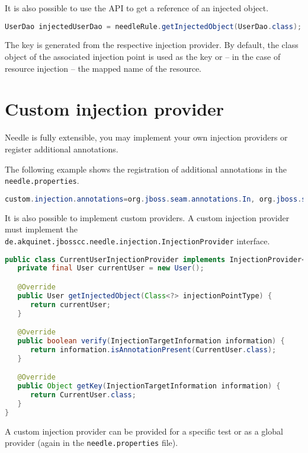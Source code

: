 It is also possible to use the API to get a reference of an injected object.

\begin{lstlisting}[language={JAVA},caption=Injected Components]
UserDao injectedUserDao = needleRule.getInjectedObject(UserDao.class);
\end{lstlisting}

The key is generated from the respective injection provider. By default, the class object of the associated injection point is used as the key or
-- in the case of resource injection -- the mapped name of the resource.

\section{Custom injection provider}
\label{sec:Custom injection provider}

Needle is fully extensible, you may implement your own injection providers or register additional annotations.

The following example shows the registration of additional annotations in the \verb|needle.properties|.

\begin{lstlisting}[language={JAVA},caption=Additional Annotation]
custom.injection.annotations=org.jboss.seam.annotations.In, org.jboss.seam.annotations.Logger
\end{lstlisting}

It is also possible to implement custom providers.
A custom injection provider must implement the \verb|de.akquinet.jbosscc.needle.injection.InjectionProvider| interface.

\begin{lstlisting}[language={JAVA},caption=javax.inject.Qualifier Injection Provider]
public class CurrentUserInjectionProvider implements InjectionProvider<User> {
   private final User currentUser = new User();

   @Override
   public User getInjectedObject(Class<?> injectionPointType) {
      return currentUser;
   }

   @Override
   public boolean verify(InjectionTargetInformation information) {
      return information.isAnnotationPresent(CurrentUser.class);
   }

   @Override
   public Object getKey(InjectionTargetInformation information) {
      return CurrentUser.class;
   }
}
\end{lstlisting}

A custom injection provider can be provided for a specific test or as a global provider (again in the \verb|needle.properties| file).

